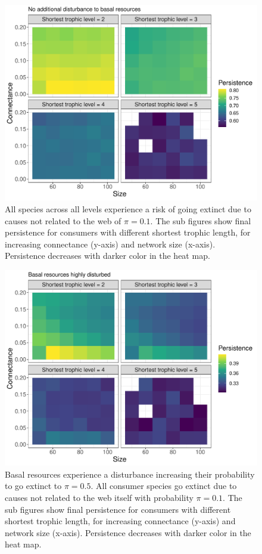\documentclass[12pt]{article}
\begin{document}
\begin{spacing}{2.0}
    \begin{figure}[h!]
     \centering
     \includegraphics[width=.9\textwidth]{figures/heatmap_STL_allCS_BP0.pdf}
     \caption{All species across all levels experience a risk of going extinct due to causes not related to the web of $\pi = 0.1$. The sub figures show final persistence for consumers with different shortest trophic length, for increasing connectance (y-axis) and network size (x-axis). Persistence decreases with darker color in the heat map.}
     \label{fig:heatmap_stl_BP0}
    \end{figure}


    \begin{figure}[h!]
     \centering
     \includegraphics[width=.9\textwidth]{figures/heatmap_STL_allCS_BP1.pdf}
     \caption{Basal resources experience a disturbance increasing their probability to go extinct to $\pi = 0.5$. All consumer species go extinct due to causes not related to the web itself with probability $\pi = 0.1$. The sub figures show final persistence for consumers with different shortest trophic length, for increasing connectance (y-axis) and network size (x-axis). Persistence decreases with darker color in the heat map.}
     \label{fig:heatmap_stl_BP1}
    \end{figure}


\end{spacing}
\end{document}
